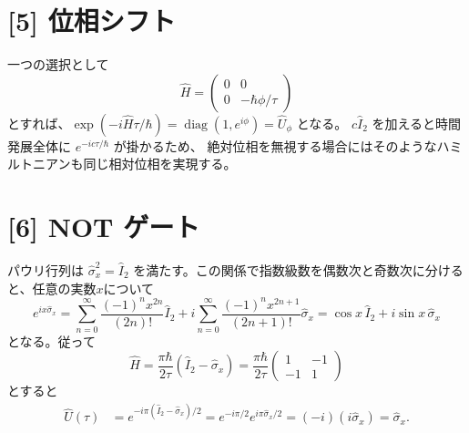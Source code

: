\documentclass[11pt,a4paper]{article}
\begin{document}
\section*{[5] 位相シフト}
一つの選択として
\begin{equation}
 \hat H=\begin{pmatrix}
  0&0\\[2pt]0&-\hbar\phi/\tau
 \end{pmatrix}
\end{equation}
とすれば、$\exp(-i\hat H\tau/\hbar)
=\operatorname{diag}(1,e^{i\phi})=\hat U_\phi$ となる。
$c\hat I_2$ を加えると時間発展全体に $e^{-ic\tau/\hbar}$ が掛かるため、
絶対位相を無視する場合にはそのようなハミルトニアンも同じ相対位相を実現する。

\section*{[6] NOT ゲート}
パウリ行列は $\hat\sigma_x^2=\hat I_2$ を満たす。この関係で指数級数を偶数次と奇数次に分けると、任意の実数$x$について
\begin{equation}
 e^{ix\hat\sigma_x}=\sum_{n=0}^{\infty}\frac{(-1)^nx^{2n}}{(2n)!}\hat I_2
 +i\sum_{n=0}^{\infty}\frac{(-1)^nx^{2n+1}}{(2n+1)!}\hat\sigma_x
 =\cos x\,\hat I_2+i\sin x\,\hat\sigma_x
\end{equation}
となる。従って
\begin{equation}
 \hat H=\frac{\pi\hbar}{2\tau}(\hat I_2-\hat\sigma_x)
 =\frac{\pi\hbar}{2\tau}
 \begin{pmatrix}1&-1\\-1&1\end{pmatrix}
\end{equation}
とすると
\begin{align}
 \hat U(\tau)
 &=e^{-i\pi(\hat I_2-\hat\sigma_x)/2}
 =e^{-i\pi/2}e^{i\pi\hat\sigma_x/2}
 =(-i)(i\hat\sigma_x)=\hat\sigma_x.
\end{align}
\end{document}
